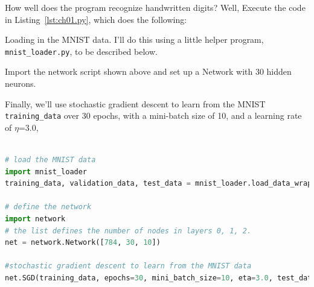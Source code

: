 How well does the program recognize handwritten digits? Well,  Execute the code in Listing~\ref{lst:ch01.py}, which does the following:


Loading in the MNIST data. I'll do this using a little helper program, \lstinline{mnist_loader.py}, to be described below.

Import the network script shown above and set up a Network with 30 hidden neurons.

Finally, we'll use stochastic gradient descent to learn from the MNIST \lstinline{training_data} over 30 epochs, with a mini-batch size of 10, and a learning rate of $\eta$=3.0, 

\begin{lstlisting}[caption={ch01.py (Python 3.7.1)},label={lst:ch01.py}, language=Python]

# load the MNIST data
import mnist_loader
training_data, validation_data, test_data = mnist_loader.load_data_wrapper()

# define the network
import network
# the list defines the number of nodes in layers 0, 1, 2.
net = network.Network([784, 30, 10])

#stochastic gradient descent to learn from the MNIST data
net.SGD(training_data, epochs=30, mini_batch_size=10, eta=3.0, test_data=test_data)

\end{lstlisting}

